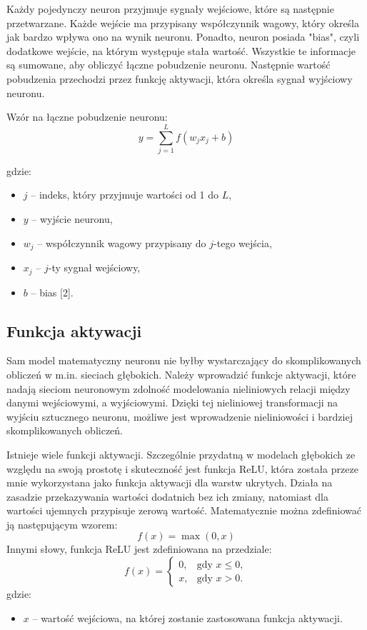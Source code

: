 \documentclass{article}
\begin{document}
Każdy pojedynczy neuron przyjmuje sygnały wejściowe, które są następnie przetwarzane.
Każde wejście ma przypisany współczynnik wagowy, który określa jak bardzo wpływa ono na wynik neuronu.
Ponadto, neuron posiada "bias", czyli dodatkowe wejście, na którym występuje stała wartość.
Wszystkie te informacje są sumowane, aby obliczyć łączne pobudzenie neuronu.
Następnie wartość pobudzenia przechodzi przez funkcję aktywacji, która określa sygnał wyjściowy neuronu.

Wzór na łączne pobudzenie neuronu:
\[
    y = \sum_{j=1}^{L} f(w_{j} x_{j} + b)
\]

gdzie:
\begin{itemize}
    \item $j$ -- indeks, który przyjmuje wartości od 1 do $L$,
    \item $y$ -- wyjście neuronu,
    \item $w_{j}$ -- współczynnik wagowy przypisany do $j$-tego wejścia,
    \item $x_{j}$ -- $j$-ty sygnał wejściowy,
    \item $b$ -- bias [2].
\end{itemize}

\subsection{Funkcja aktywacji}
Sam model matematyczny neuronu nie byłby wystarczający do skomplikowanych obliczeń w m.in. sieciach głębokich.
Należy wprowadzić funkcje aktywacji, które nadają sieciom neuronowym zdolność modelowania nieliniowych relacji między danymi wejściowymi, a wyjściowymi.
Dzięki tej nieliniowej transformacji na wyjściu sztucznego neuronu, możliwe jest wprowadzenie nieliniowości i bardziej skomplikowanych obliczeń.

Istnieje wiele funkcji aktywacji.
Szczególnie przydatną w modelach głębokich ze względu na swoją prostotę i skuteczność jest funkcja ReLU, która została przeze mnie wykorzystana jako funkcja aktywacji dla warstw ukrytych.
Działa na zasadzie przekazywania wartości dodatnich bez ich zmiany, natomiast dla wartości ujemnych przypisuje zerową wartość.
Matematycznie można zdefiniować ją następującym wzorem:
\[
    f(x) = \max(0, x)
\]
Innymi słowy, funkcja ReLU jest zdefiniowana na przedziale:
\[
    f(x) = \begin{cases}
        0, & \text{gdy } x \leq 0, \\
        x, & \text{gdy } x > 0.
    \end{cases}
\]
gdzie:
\begin{itemize}
    \item $x$ -- wartość wejściowa, na której zostanie zastosowana funkcja aktywacji.
\end{itemize}
\end{document}
